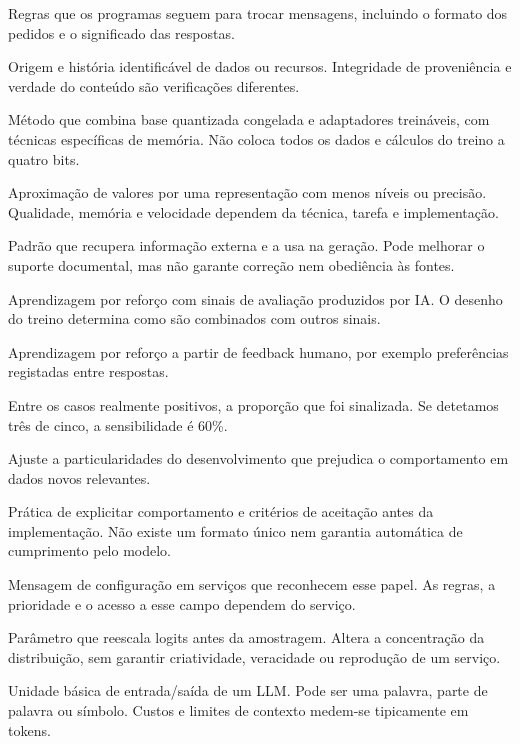 \begin{description}[style=nextline,leftmargin=0pt,labelindent=0pt,labelsep=0pt,labelwidth=0pt]
\item[Protocolo] Regras que os programas seguem para trocar mensagens, incluindo o formato dos pedidos e o significado das respostas.
\item[Proveniência] Origem e história identificável de dados ou recursos. Integridade de proveniência e verdade do conteúdo são verificações diferentes.
\item[QLoRA] Método que combina base quantizada congelada e adaptadores treináveis, com técnicas específicas de memória. Não coloca todos os dados e cálculos do treino a quatro bits.
\item[Quantização] Aproximação de valores por uma representação com menos níveis ou precisão. Qualidade, memória e velocidade dependem da técnica, tarefa e implementação.
\item[RAG (Retrieval-Augmented Generation)] Padrão que recupera informação externa e a usa na geração. Pode melhorar o suporte documental, mas não garante correção nem obediência às fontes.
\item[RLAIF] Aprendizagem por reforço com sinais de avaliação produzidos por IA. O desenho do treino determina como são combinados com outros sinais.
\item[RLHF (Reinforcement Learning from Human Feedback)] Aprendizagem por reforço a partir de feedback humano, por exemplo preferências registadas entre respostas.
\item[Sensibilidade] Entre os casos realmente positivos, a proporção que foi sinalizada. Se detetamos três de cinco, a sensibilidade é 60\%.
\item[Sobreajustamento] Ajuste a particularidades do desenvolvimento que prejudica o comportamento em dados novos relevantes.
\item[Spec-First] Prática de explicitar comportamento e critérios de aceitação antes da implementação. Não existe um formato único nem garantia automática de cumprimento pelo modelo.
\item[System prompt] Mensagem de configuração em serviços que reconhecem esse papel. As regras, a prioridade e o acesso a esse campo dependem do serviço.
\item[Temperatura] Parâmetro que reescala logits antes da amostragem. Altera a concentração da distribuição, sem garantir criatividade, veracidade ou reprodução de um serviço.
\item[Token] Unidade básica de entrada/saída de um LLM. Pode ser uma palavra, parte de palavra ou símbolo. Custos e limites de contexto medem-se tipicamente em tokens.

\end{description}
